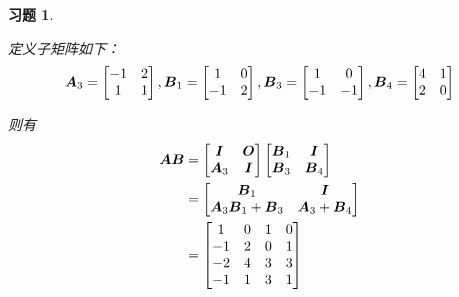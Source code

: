 \documentclass{ctexart}
\newtheorem{problem}{习题}[section]
\begin{document}
\begin{problem}\

定义子矩阵如下：
\begin{equation*}
    \boldsymbol{A}_3=
    \begin{bmatrix}
        -1 & 2 \\1&1
    \end{bmatrix},
    \boldsymbol{B}_1=
    \begin{bmatrix}
        1 & 0 \\-1&2
    \end{bmatrix},
    \boldsymbol{B}_3=
    \begin{bmatrix}
        1 & 0 \\-1&-1
    \end{bmatrix},
    \boldsymbol{B}_4=
    \begin{bmatrix}
        4 & 1 \\2&0
    \end{bmatrix}
\end{equation*}

则有
\begin{align*}
    \boldsymbol{A}\boldsymbol{B} & =
    \begin{bmatrix}
        \boldsymbol{I} & \boldsymbol{O} \\\boldsymbol{A}_3&\boldsymbol{I}
    \end{bmatrix}
    \begin{bmatrix}
        \boldsymbol{B}_1 & \boldsymbol{I} \\\boldsymbol{B}_3&\boldsymbol{B}_4
    \end{bmatrix} \\&=
    \begin{bmatrix}
        \boldsymbol{B}_1 & \boldsymbol{I} \\\boldsymbol{A}_3\boldsymbol{B}_1+\boldsymbol{B}_3&\boldsymbol{A}_3+\boldsymbol{B}_4
    \end{bmatrix} \\&=
    \begin{bmatrix}
        1  & 0 & 1 & 0 \\
        -1 & 2 & 0 & 1 \\
        -2 & 4 & 3 & 3 \\
        -1 & 1 & 3 & 1
    \end{bmatrix}
\end{align*}

\end{problem}
\end{document}
